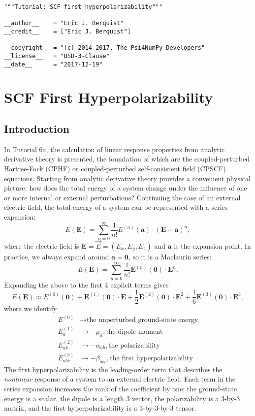 \begin{verbatim}
"""Tutorial: SCF first hyperpolarizability"""

__author__    = "Eric J. Berquist"
__credit__    = ["Eric J. Berquist"]

__copyright__ = "(c) 2014-2017, The Psi4NumPy Developers"
__license__   = "BSD-3-Clause"
__date__      = "2017-12-19"
\end{verbatim}

\hypertarget{scf-first-hyperpolarizability}{%
  \section{SCF First Hyperpolarizability}\label{scf-first-hyperpolarizability}}

\hypertarget{introduction}{%
  \subsection{Introduction}\label{introduction}}

In Tutorial 6a, the calculation of linear response properties from analytic derivative theory is presented, the foundation of which are the coupled-perturbed Hartree-Fock (CPHF) or coupled-perturbed self-consistent field (CPSCF) equations. Starting from analytic derivative theory provides a convenient physical picture: how does the total energy of a system change under the influence of one or more internal or external perturbations? Continuing the case of an external electric field, the total energy of a system can be represented with a series expansion:
\[
  E(\mathbf{E}) = \sum_{n=0}^{\infty} \frac{1}{n!}E^{(n)}(\mathbf{a})\cdot(\mathbf{E}-\mathbf{a})^{n},
\]
where the electric field is \(\mathbf{E} = \vec{E} = (E_x,E_y,E_z)\) and \(\mathbf{a}\) is the expansion point. In practice, we always expand around \(\mathbf{a} = \mathbf{0}\), so it is a Maclaurin series:
\[
  E(\mathbf{E}) = \sum_{n=0}^{\infty} \frac{1}{n!}\mathbf{E}^{(n)}(\mathbf{0})\cdot\mathbf{E}^{n}.
\]
Expanding the above to the first 4 explicit terms gives
\[
  E(\mathbf{E}) \approx E^{(0)}(\mathbf{0}) + \mathbf{E}^{(1)}(\mathbf{0})\cdot\mathbf{E} + \frac{1}{2}\mathbf{E}^{(2)}(\mathbf{0})\cdot\mathbf{E}^{2} + \frac{1}{6}\mathbf{E}^{(3)}(\mathbf{0})\cdot\mathbf{E}^{3},
\]
where we identify
\begin{align}
E^{(0)} &\rightarrow \textrm{the unperturbed ground-state energy} \\
E_{a}^{(1)} &\rightarrow -\mu_{a},\textrm{the dipole moment} \\
E_{ab}^{(2)} &\rightarrow -\alpha_{ab},\textrm{the polarizability} \\
E_{abc}^{(3)} &\rightarrow -\beta_{abc},\textrm{the first hyperpolarizability}
\end{align}
The first hyperpolarizability is the leading-order term that describes the \emph{nonlinear} response of a system to an external electric field.  Each term in the series expansion increases the rank of the coefficient by one: the ground-state energy is a scalar, the dipole is a length 3 vector, the polarizability is a 3-by-3 matrix, and the first hyperpolarizability is a 3-by-3-by-3 tensor.


